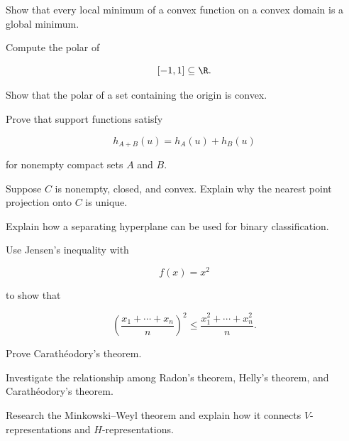 \begin{exercise}[3]
Show that every local minimum of a convex function on a convex domain is a
global minimum.
\end{exercise}

\begin{exercise}[3]
Compute the polar of

\[
[-1,1]\subseteq\R.
\]
\end{exercise}

\begin{exercise}[3]
Show that the polar of a set containing the origin is convex.
\end{exercise}

\begin{exercise}[3]
Prove that support functions satisfy

\[
h_{A+B}(u)=h_A(u)+h_B(u)
\]

for nonempty compact sets \(A\) and \(B\).
\end{exercise}

\begin{exercise}[3]
Suppose \(C\) is nonempty, closed, and convex. Explain why the nearest point
projection onto \(C\) is unique.
\end{exercise}

\begin{exercise}[3]
Explain how a separating hyperplane can be used for binary classification.
\end{exercise}

\begin{exercise}[3]
Use Jensen's inequality with

\[
f(x)=x^2
\]

to show that

\[
\left(
\frac{x_1+\cdots+x_n}{n}
\right)^2
\leq
\frac{x_1^2+\cdots+x_n^2}{n}.
\]
\end{exercise}

\begin{exercise}[4]
Prove Carath\'eodory's theorem.
\end{exercise}

\begin{exercise}[4]
Investigate the relationship among Radon's theorem, Helly's theorem, and
Carath\'eodory's theorem.
\end{exercise}

\begin{exercise}[4]
Research the Minkowski--Weyl theorem and explain how it connects
\(V\)-representations and \(H\)-representations.
\end{exercise}

